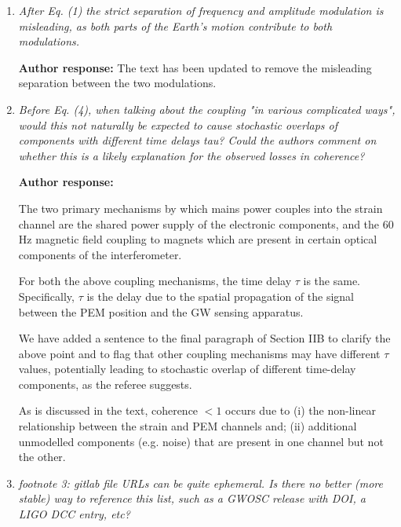 \documentclass[10pt]{article}
\begin{document}
\begin{enumerate}
		\textbf{Author response:}  \newline 
The abbreviation ASD is now defined in the caption of Figure 1.
	
	
	\item \textit{After Eq. (1) the strict separation of frequency and amplitude modulation is  
		misleading, as both parts of the Earth's motion contribute to both modulations.}
	
		\textbf{Author response:}  \newline 
The text has been updated to remove the misleading separation between the two modulations.


	
	\item \textit{Before Eq. (4), when talking about the coupling "in various complicated  
		ways", would this not naturally be expected to cause stochastic overlaps of  
		components with different time delays tau? Could the authors comment on whether  
		this is a likely explanation for the observed losses in coherence?  }
	
			\textbf{Author response:}  \newline 
			
			The two primary mechanisms by which mains power couples into the strain channel are the shared power supply of the electronic components, and the 60 Hz magnetic field coupling to magnets which are present in certain optical components of the interferometer. 
			
			For both the above coupling mechanisms, the time delay $\tau$ is the same. Specifically, $\tau$ is the delay due to the spatial propagation of the signal between the PEM position and the GW sensing apparatus. 
			
			We have added a sentence to the final paragraph of Section IIB to clarify the above point and to flag that other coupling mechanisms may have different $\tau$ values, potentially leading to stochastic overlap of different time-delay components, as the referee suggests.
			
			As is discussed in the text, coherence $<1$ occurs due to (i) the non-linear relationship between the strain and PEM channels and; (ii) additional unmodelled components (e.g. noise) that are present in one channel but not the other. 

			
	\item \textit{footnote 3: gitlab file URLs can be quite ephemeral. Is there no better  
		(more stable) way to reference this list, such as a GWOSC release with DOI, a  
		LIGO DCC entry, etc?}
	

\end{enumerate}
\end{document}
